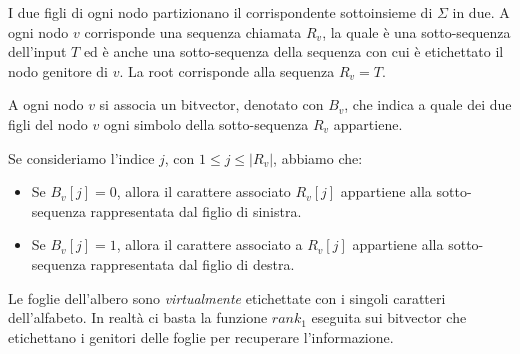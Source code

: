 I due figli di ogni nodo partizionano il corrispondente sottoinsieme di $\Sigma$
in due. A ogni nodo $v$ corrisponde una sequenza chiamata $R_v$, la quale è una
sotto-sequenza dell'input $T$ ed è anche una sotto-sequenza della sequenza con
cui è etichettato il nodo genitore di $v$. La root corrisponde alla sequenza $R_v = T$.

A ogni nodo $v$ si associa un bitvector, denotato con $B_v$, che indica a quale
dei due figli del nodo $v$ ogni simbolo della sotto-sequenza $R_v$ appartiene.

Se consideriamo l'indice $j$, con $1 \leq j \leq |R_v|$, abbiamo che:
\begin{itemize}
    \item Se $B_v [j] = 0$, allora il carattere associato $R_v [j]$ appartiene
          alla sotto-sequenza rappresentata dal figlio di sinistra.
    \item Se $B_v [j] = 1$, allora il carattere associato a $R_v [j]$ appartiene
          alla sotto-sequenza rappresentata dal figlio di destra.
\end{itemize}
Le foglie dell'albero sono \textit{virtualmente} etichettate con i singoli
caratteri dell'alfabeto. In realtà ci basta la funzione $rank_1$ eseguita sui
bitvector che etichettano i genitori delle foglie per recuperare l'informazione.
